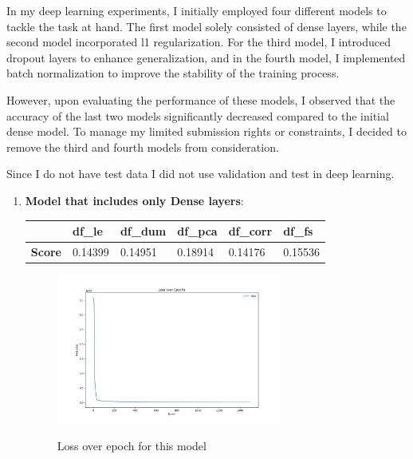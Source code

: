 In my deep learning experiments, I initially employed four different models to tackle the task at hand. The first model solely consisted of dense layers, while the second model incorporated l1 regularization. For the third model, I introduced dropout layers to enhance generalization, and in the fourth model, I implemented batch normalization to improve the stability of the training process.

However, upon evaluating the performance of these models, I observed that the accuracy of the last two models significantly decreased compared to the initial dense model. To manage my limited submission rights or constraints, I decided to remove the third and fourth models from consideration. 

Since I do not have test data I did not use validation and test in deep learning.
\begin{enumerate}[]
  \item \textbf{Model that includes only Dense layers}: 
  \begin{table}[H]
\begin{tabular}{l|l|l|l|l|l|}
\cline{2-6}
                                   & \textbf{df\_le} & \textbf{df\_dum} & \textbf{df\_pca} & \textbf{df\_corr} & \textbf{df\_fs} \\ \hline
\multicolumn{1}{|l|}{\textbf{Score}} & 0.14399         & 0.14951           & 0.18914          & 0.14176           & 0.15536         \\ \hline
\end{tabular}
\end{table}



\begin{figure}[H]
  \centering
  \includegraphics[width=0.7\textwidth]{./fig/losofdeep.png}
  \label{fig:corr1}
  \caption{Loss over epoch for this model}
\end{figure}





\end{enumerate}
